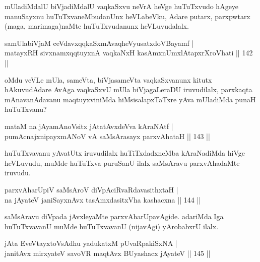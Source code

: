 \begin{artha}%
mUladiMdalU biVjadiMdalU vaqkaSxvu neVrA heVge huTuTxvudo hAgeye manuSayxnu huTuTxvaneMbudanUnx heVLabeVku, Adare putarx, parxpwtarx (maga, marimaga)naMte huTuTxvudanunx heVLuvudalalx.
\end{artha}


\begin{shl}
samUlabiVjaM ceVdavxqqkaSxmAvaqheVyusatxdoVBayamf |\\
matayxRH sivxnamxqqtuyxnA vaqkaNxH kasAmxnUmxlAtapxrXroVhati \hfill || 142 ||
\end{shl}

\begin{artha}
oMdu veVLe mUla, sameVta, biVjasameVta vaqkaSxvanunx kitutx hAkuvudAdare AvAga vaqkaSxvU mUla biVjagaLeraDU iruvudilalx, parxkaqta mAnavanAdavanu maqtuyxviniMda hiMsisalapxTaTxre yAva mUladiMda punaH huTuTxvanu?
\end{artha}


\begin{shl}
mataM na jAyamAnoV\s sitx jAtatAvxdeVva kAraNAtf |\\
pumAcnajxnipayxmANoV vA saMsArasayx parxvAhataH \hfill || 143 ||
\end{shl}

\begin{artha}
huTuTxvavanu yAvatUtx iruvudilalx huTiTxdadxneMba kAraNadiMda hiVge heVLuvudu, muMde huTuTxva puruSanU ilalx saMsAravu parxvAhadaMte iruvudu.
\end{artha}

\begin{shl}
parxvAharUpiV saMsAroV diVpAciRvaRdavasithxtaH |\\
na jAyateV janiSayxnAvx tasAmxdasitxVha kashacxna \hfill || 144 ||
\end{shl}

\begin{artha}
saMsAravu diVpada jAvxleyaMte parxvAharUpavAgide. adariMda Iga huTuTxvavanU muMde huTuTxvavanU (nijavAgi) yArobabxrU ilalx.
\end{artha}%


\begin{shl}
jAta EveVtayxtoV\s sAdhu yadukatxM pUvaRpakiSxNA |\\
janitAvx mirxyateV savoVR maqtAvx BUyashacx jAyateV \hfill || 145 ||
\end{shl}

